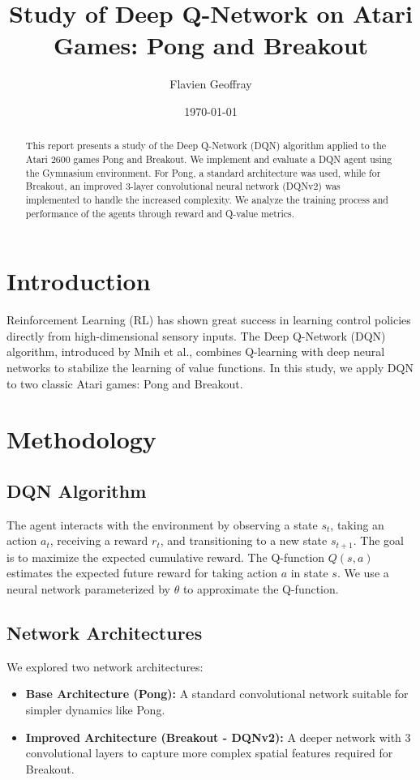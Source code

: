 \documentclass{article}
\title{Study of Deep Q-Network on Atari Games: Pong and Breakout}
\author{Flavien Geoffray}
\date{\today}
\begin{document}
\maketitle

\begin{abstract}
    This report presents a study of the Deep Q-Network (DQN) algorithm applied to the Atari 2600 games Pong and Breakout. We implement and evaluate a DQN agent using the Gymnasium environment. For Pong, a standard architecture was used, while for Breakout, an improved 3-layer convolutional neural network (DQNv2) was implemented to handle the increased complexity. We analyze the training process and performance of the agents through reward and Q-value metrics.
\end{abstract}

\section{Introduction}
Reinforcement Learning (RL) has shown great success in learning control policies directly from high-dimensional sensory inputs. The Deep Q-Network (DQN) algorithm, introduced by Mnih et al., combines Q-learning with deep neural networks to stabilize the learning of value functions. In this study, we apply DQN to two classic Atari games: Pong and Breakout.

\section{Methodology}

\subsection{DQN Algorithm}
The agent interacts with the environment by observing a state $s_t$, taking an action $a_t$, receiving a reward $r_t$, and transitioning to a new state $s_{t+1}$. The goal is to maximize the expected cumulative reward. The Q-function $Q(s, a)$ estimates the expected future reward for taking action $a$ in state $s$. We use a neural network parameterized by $\theta$ to approximate the Q-function.

\subsection{Network Architectures}
We explored two network architectures:
\begin{itemize}
    \item \textbf{Base Architecture (Pong):} A standard convolutional network suitable for simpler dynamics like Pong.
    \item \textbf{Improved Architecture (Breakout - DQNv2):} A deeper network with 3 convolutional layers to capture more complex spatial features required for Breakout.
\end{itemize}
\end{document}
